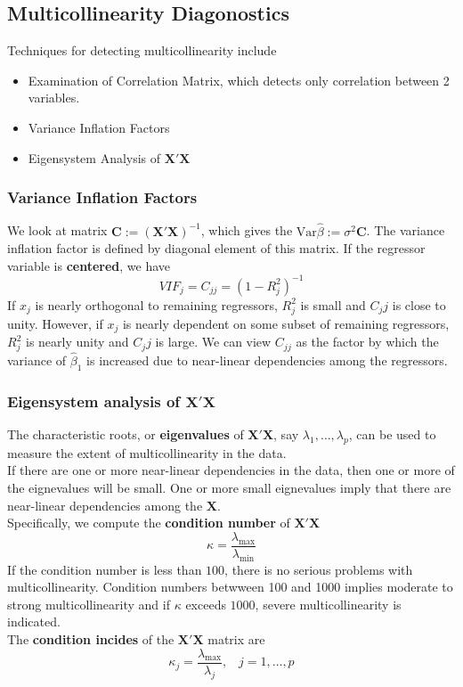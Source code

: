 \documentclass[11pt]{article}
\newcommand{\var}{\mathrm{Var}}
\theoremstyle{definition}
\begin{document}
\subsection{Multicollinearity Diagonostics}
Techniques for detecting multicollinearity include
\begin{itemize}
  \item Examination of Correlation Matrix, which detects only correlation between 2 variables.
  \item Variance Inflation Factors
  \item Eigensystem Analysis of $\bm{X}'\bm{X}$
\end{itemize}
\subsubsection{Variance Inflation Factors}
We look at matrix $\mathbf{C}:=(\bm{X}'\bm{X})^{-1}$, which gives the $\var{\hat{\beta}}:=\sigma^2\mathbf{C}$. The variance inflation factor is defined by diagonal element of this matrix. If the regressor variable is \textbf{centered}, we have 
\[
VIF_j=C_{jj}=(1-R_j^2)^{-1}
\]
If $x_j$ is nearly orthogonal to remaining regressors, $R_j^2$ is small and $C_jj$ is close to unity. However, if $x_j$ is nearly dependent on some subset of remaining regressors, $R_j^2$ is nearly unity and $C_jj$ is large. We can view $C_{jj}$ as the factor by which the variance of $\hat{\beta}_1$ is increased due to near-linear dependencies among the regressors.
\subsubsection{Eigensystem analysis of {$\bm{X}'\bm{X}$}}
The characteristic roots, or \textbf{eigenvalues} of $\bm{X}'\bm{X}$, say $\lambda_1,\ldots, \lambda_p$, can be used to measure the extent of multicollinearity in the data.\\
If there are one or more near-linear dependencies in the data, then one or more of the eignevalues will be small. One or more small eignevalues imply that there are near-linear dependencies among the $\bm{X}$.\\
Specifically, we compute the \textbf{condition number} of $\bm{X}'\bm{X}$
\[
\kappa = \frac{\lambda_{\max}}{\lambda_{\min}}
\]
If the condition number is less than $100$, there is no serious problems with multicollinearity. Condition numbers betwween 100 and 1000 implies moderate to strong multicollinearity and if $\kappa$ exceeds $1000$, severe multicollinearity is indicated.\\
The \textbf{condition incides} of the $\bm{X}'\bm{X}$ matrix are 
\[
\kappa_j=\frac{\lambda_{\max}}{\lambda_j},\;\;\;j=1,\ldots, p
\]
\end{document}
